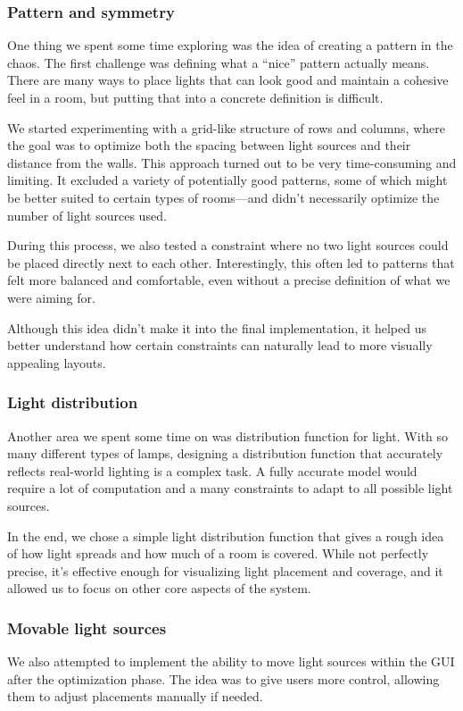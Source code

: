 \documentclass{article}
\begin{document}
\subsubsection{Pattern and symmetry}
One thing we spent some time exploring was the idea of creating a pattern in the chaos. The first challenge was defining what a “nice” pattern actually means. There are many ways to place lights that can look good and maintain a cohesive feel in a room, but putting that into a concrete definition is difficult.

We started experimenting with a grid-like structure of rows and columns, where the goal was to optimize both the spacing between light sources and their distance from the walls. This approach turned out to be very time-consuming and limiting. It excluded a variety of potentially good patterns, some of which might be better suited to certain types of rooms—and didn’t necessarily optimize the number of light sources used.

During this process, we also tested a constraint where no two light sources could be placed directly next to each other. Interestingly, this often led to patterns that felt more balanced and comfortable, even without a precise definition of what we were aiming for.

Although this idea didn’t make it into the final implementation, it helped us better understand how certain constraints can naturally lead to more visually appealing layouts.

\subsubsection{Light distribution}
Another area we spent some time on was distribution function for light. With so many different types of lamps, designing a distribution function that accurately reflects real-world lighting is a complex task. A fully accurate model would require a lot of computation and a many constraints to adapt to all possible light sources.

In the end, we chose a simple light distribution function that gives a rough idea of how light spreads and how much of a room is covered. While not perfectly precise, it’s effective enough for visualizing light placement and coverage, and it allowed us to focus on other core aspects of the system.

\subsubsection{Movable light sources}
We also attempted to implement the ability to move light sources within the GUI after the optimization phase. The idea was to give users more control, allowing them to adjust placements manually if needed.
\end{document}

